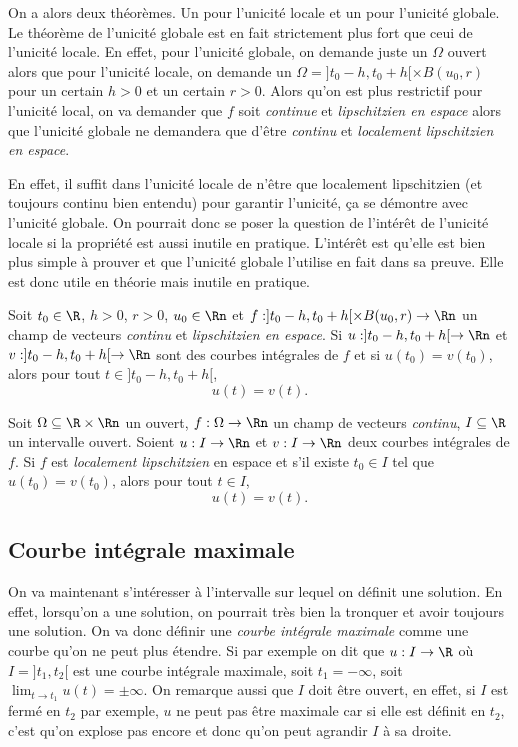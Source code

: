 On a alors deux théorèmes.
Un pour l'unicité locale et un pour l'unicité globale.
Le théorème de l'unicité globale est en fait strictement plus
fort que ceui de l'unicité locale.
En effet, pour l'unicité globale, on demande juste un $\Omega$ ouvert
alors que pour l'unicité locale, on demande un
$\Omega=]t_0-h,t_0+h[ \times B(u_0,r)$
pour un certain $h>0$ et un certain $r>0$.
Alors qu'on est plus restrictif pour l'unicité local,
on va demander que $f$ soit \emph{continue} et \emph{lipschitzien en espace}
alors que l'unicité globale ne demandera que d'être \emph{continu} et
\emph{localement lipschitzien en espace}.

En effet, il suffit dans l'unicité locale de n'être que localement
lipschitzien (et toujours continu bien entendu)
pour garantir l'unicité, ça se démontre avec l'unicité globale.
On pourrait donc se poser la question de l'intérêt de l'unicité
locale si la propriété est aussi inutile en pratique.
L'intérêt est qu'elle est bien plus simple à prouver et que l'unicité
globale l'utilise en fait dans sa preuve.
Elle est donc utile en théorie mais inutile en pratique.

\begin{myprop}
  Soit $t_0 \in \R$, $h > 0$, $r > 0$, $u_0 \in \Rn$ et
  $f:]t_0-h,t_0+h[ \times B(u_0,r) \to \Rn$ un champ de vecteurs
  \emph{continu} et \emph{lipschitzien en espace}.
  Si $u:]t_0-h,t_0+h[\to\Rn$ et $v:]t_0-h,t_0+h[\to\Rn$ sont des courbes
  intégrales de $f$ et si $u(t_0) = v(t_0)$, alors pour tout
  $t \in ]t_0-h,t_0+h[$,
  \[ u(t) = v(t). \]
\end{myprop}
\begin{myprop}
  Soit $\Omega \subseteq \R\times\Rn$ un ouvert,
  $f: \Omega\to \Rn$ un champ de vecteurs \emph{continu},
  $I \subseteq \R$ un intervalle ouvert.
  Soient $u:I\to \Rn$ et $v:I \to \Rn$ deux courbes intégrales de $f$.
  Si $f$ est \emph{localement lipschitzien} en espace
  et s'il existe $t_0 \in I$
  tel que $u(t_0) = v(t_0)$, alors pour tout $t \in I$,
  \[ u(t) = v(t). \]
\end{myprop}

\subsection{Courbe intégrale maximale}
On va maintenant s'intéresser à l'intervalle
sur lequel on définit une solution.
En effet, lorsqu'on a une solution,
on pourrait très bien la tronquer et avoir toujours une solution.
On va donc définir une \emph{courbe intégrale maximale} comme une courbe
qu'on ne peut plus étendre.
Si par exemple on dit que $u:I\to\R$ où $I = ]t_1,t_2[$
est une courbe intégrale maximale,
soit $t_1 = -\infty$, soit $\lim_{t\to t_1} u(t) = \pm\infty$.
On remarque aussi que $I$ doit être ouvert, en effet, si $I$ est fermé en
$t_2$ par exemple, $u$ ne peut pas être maximale car si elle est définit en
$t_2$, c'est qu'on explose pas encore et donc qu'on peut agrandir $I$
à sa droite.

